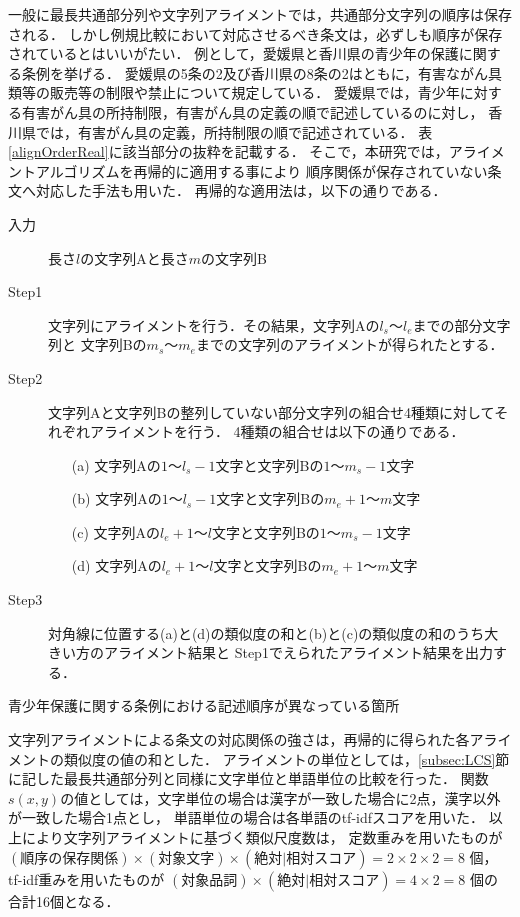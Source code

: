 \documentclass[japanese]{jnlp_1.4}
\begin{document}
一般に最長共通部分列や文字列アライメントでは，共通部分文字列の順序は保存される．
しかし例規比較において対応させるべき条文は，必ずしも順序が保存されているとはいいがたい．
例として，愛媛県と香川県の青少年の保護に関する条例を挙げる．
愛媛県の5条の2及び香川県の8条の2はともに，有害ながん具類等の販売等の制限や禁止について規定している．
愛媛県では，青少年に対する有害がん具の所持制限，有害がん具の定義の順で記述しているのに対し，
香川県では，有害がん具の定義，所持制限の順で記述されている．
表\ref{alignOrderReal}に該当部分の抜粋を記載する．
そこで，本研究では，アライメントアルゴリズムを再帰的に適用する事により
順序関係が保存されていない条文へ対応した手法も用いた．
再帰的な適用法は，以下の通りである．

\begin{description}
\item[入力]長さ$l$の文字列Aと長さ$m$の文字列B
\item[Step1] 文字列にアライメントを行う．その結果，文字列Aの$l_s$〜$l_e$までの部分文字列と
文字列Bの$m_s$〜$m_e$までの文字列のアライメントが得られたとする．
\item[Step2] 文字列Aと文字列Bの整列していない部分文字列の組合せ4種類に対してそれぞれアライメントを行う．
4種類の組合せは以下の通りである．
\begin{itemize}
\item[(a)] 文字列Aの$1$〜$l_s-1$文字と文字列Bの$1$〜$m_s-1$文字
\item[(b)] 文字列Aの$1$〜$l_s-1$文字と文字列Bの$m_e+1$〜$m$文字
\item[(c)]文字列Aの$l_e+1$〜$l$文字と文字列Bの$1$〜$m_s-1$文字
\item[(d)]文字列Aの$l_e+1$〜$l$文字と文字列Bの$m_e+1$〜$m$文字
\end{itemize}
\item[Step3]  対角線に位置する(a)と(d)の類似度の和と(b)と(c)の類似度の和のうち大きい方のアライメント結果と
Step1でえられたアライメント結果を出力する．
\end{description}


\begin{table}[b]
\caption{青少年保護に関する条例における記述順序が異なっている箇所}
\label{alignOrderReal}

\end{table}


文字列アライメントによる条文の対応関係の強さは，再帰的に得られた各アライメントの類似度の値の和とした．
アライメントの単位としては，\ref{subsec:LCS}節に記した最長共通部分列と同様に文字単位と単語単位の比較を行った．
関数$s(x,y)$の値としては，文字単位の場合は漢字が一致した場合に2点，漢字以外が一致した場合1点とし，
単語単位の場合は各単語のtf-idfスコアを用いた．
以上により文字列アライメントに基づく類似尺度数は，
定数重みを用いたものが $(\text{順序の保存関係}) \times (\text{対象文字}) \times (\text{絶対}|\text{相対スコア}) = 2 \times 2 \times 2 = 8$ 個，
tf-idf重みを用いたものが $(\text{対象品詞}) \times (\text{絶対}|\text{相対スコア}) = 4 \times 2 =8$ 個の
合計16個となる．
\end{document}
